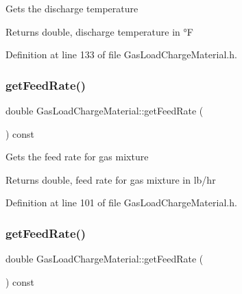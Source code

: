 Gets the discharge temperature \begin{DoxyReturn}{Returns}
double, discharge temperature in °F 
\end{DoxyReturn}


Definition at line 133 of file Gas\+Load\+Charge\+Material.\+h.

\mbox{\label{class_gas_load_charge_material_ae14ebe9b7091a491166174968505b6ee}} 
\subsubsection{\texorpdfstring{get\+Feed\+Rate()}{getFeedRate()}\hspace{0.1cm}{\footnotesize\ttfamily [1/3]}}
{\footnotesize\ttfamily double Gas\+Load\+Charge\+Material\+::get\+Feed\+Rate (\begin{DoxyParamCaption}{ }\end{DoxyParamCaption}) const\hspace{0.3cm}{\ttfamily [inline]}}

Gets the feed rate for gas mixture \begin{DoxyReturn}{Returns}
double, feed rate for gas mixture in lb/hr 
\end{DoxyReturn}


Definition at line 101 of file Gas\+Load\+Charge\+Material.\+h.

\mbox{\label{class_gas_load_charge_material_ae14ebe9b7091a491166174968505b6ee}} 
\subsubsection{\texorpdfstring{get\+Feed\+Rate()}{getFeedRate()}\hspace{0.1cm}{\footnotesize\ttfamily [2/3]}}
{\footnotesize\ttfamily double Gas\+Load\+Charge\+Material\+::get\+Feed\+Rate (\begin{DoxyParamCaption}{ }\end{DoxyParamCaption}) const\hspace{0.3cm}{\ttfamily [inline]}}

